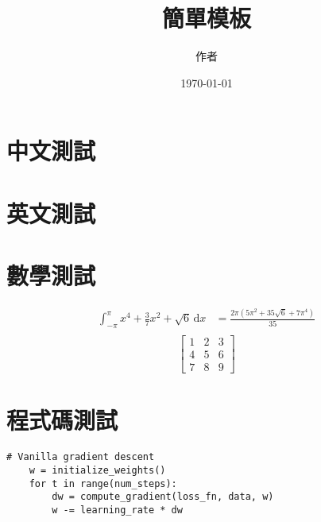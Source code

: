 \documentclass[12pt]{article}
\title{簡單模板}
\author{作者}
\date{\today}
\begin{document}
\maketitle

\section{中文測試}
\zhlipsum[1]
\section{英文測試}
\lipsum[1]
\section{數學測試}
\begin{align}
	\int_{-\pi }^{\pi } x^{4} + \frac{3}{7}x^2 + \sqrt{6}   \,\mathrm{d}x & = \frac{2 \pi (5 \pi^{2} + 35 \sqrt{6} + 7 \pi^{4})}{35} \\
\end{align}
\[
	\begin{bmatrix}
		1 & 2 & 3 \\
		4 & 5 & 6 \\
		7 & 8 & 9
	\end{bmatrix}
\]

\section{程式碼測試}

\begin{verbatim}
# Vanilla gradient descent
    w = initialize_weights()
    for t in range(num_steps):
        dw = compute_gradient(loss_fn, data, w)
        w -= learning_rate * dw
\end{verbatim}

\section{}


\nocite{*}


\end{document}
